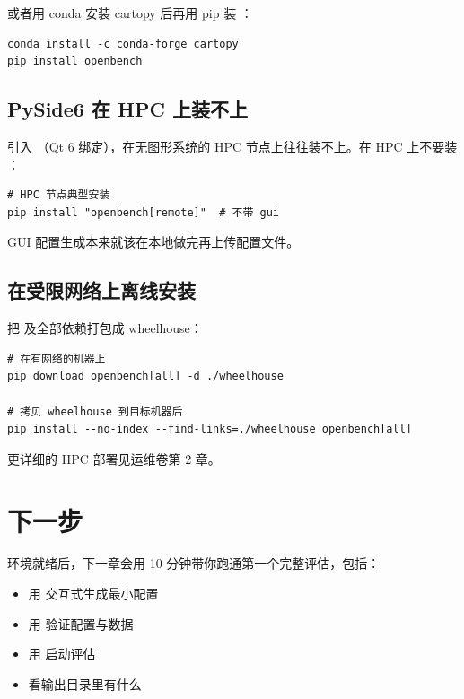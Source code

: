 或者用 conda 安装 cartopy 后再用 pip 装 \openbench{}：

\begin{verbatim}
conda install -c conda-forge cartopy
pip install openbench
\end{verbatim}

\subsection{PySide6 在 HPC 上装不上}

\cli{[gui]} 引入 （Qt 6 绑定），在无图形系统的 HPC 节点上往往装不上。在 HPC 上不要装 \cli{[gui]}：

\begin{verbatim}
# HPC 节点典型安装
pip install "openbench[remote]"  # 不带 gui
\end{verbatim}

GUI 配置生成本来就该在本地做完再上传配置文件。

\subsection{在受限网络上离线安装}

把 \openbench{} 及全部依赖打包成 wheelhouse：

\begin{verbatim}
# 在有网络的机器上
pip download openbench[all] -d ./wheelhouse

# 拷贝 wheelhouse 到目标机器后
pip install --no-index --find-links=./wheelhouse openbench[all]
\end{verbatim}

更详细的 HPC 部署见运维卷第 2 章。

\section{下一步}

环境就绪后，下一章会用 10 分钟带你跑通第一个完整评估，包括：

\begin{itemize}
  \item 用  交互式生成最小配置
  \item 用  验证配置与数据
  \item 用  启动评估
  \item 看输出目录里有什么
\end{itemize}
